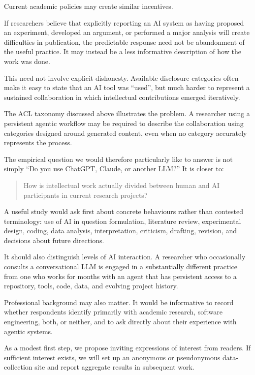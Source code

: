 Current academic policies may create similar incentives.

If researchers believe that explicitly reporting an AI system as having proposed an experiment, developed an argument, or performed a major analysis will create difficulties in publication, the predictable response need not be abandonment of the useful practice. It may instead be a less informative description of how the work was done.

This need not involve explicit dishonesty. Available disclosure categories often make it easy to state that an AI tool was ``used'', but much harder to represent a sustained collaboration in which intellectual contributions emerged iteratively.

The ACL taxonomy discussed above illustrates the problem. A researcher using a persistent agentic workflow may be required to describe the collaboration using categories designed around generated content, even when no category accurately represents the process.

The empirical question we would therefore particularly like to answer is not simply ``Do you use ChatGPT, Claude, or another LLM?'' It is closer to:

\begin{quote}
How is intellectual work actually divided between human and AI participants in current research projects?
\end{quote}

A useful study would ask first about concrete behaviours rather than contested terminology: use of AI in question formulation, literature review, experimental design, coding, data analysis, interpretation, criticism, drafting, revision, and decisions about future directions.

It should also distinguish levels of AI interaction. A researcher who occasionally consults a conversational LLM is engaged in a substantially different practice from one who works for months with an agent that has persistent access to a repository, tools, code, data, and evolving project history.

Professional background may also matter. It would be informative to record whether respondents identify primarily with academic research, software engineering, both, or neither, and to ask directly about their experience with agentic systems.

As a modest first step, we propose inviting expressions of interest from readers. If sufficient interest exists, we will set up an anonymous or pseudonymous data-collection site and report aggregate results in subsequent work.


